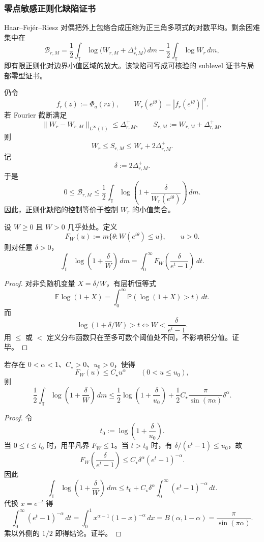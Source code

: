 \subsubsection{零点敏感正则化缺陷证书}\label{subsubsec:typed-address-biaxial-completion-zero-aware-regularization-gap-certificate}
Haar--Fej\'er--Riesz 对偶把外上包络合成压缩为正三角多项式的对数平均。剩余困难集中在
\[
\mathcal B_{r,M}
=
\frac12\int_{\mathbb T}\log\bigl(W_{r,M}+\Delta_{r,M}^+\bigr)\,dm
-
\frac12\int_{\mathbb T}\log W_r\,dm,
\]
即有限正则化对边界小值区域的放大。该缺陷可写成可核验的 sublevel 证书与局部零型证书。

仍令
\[
f_r(z):=\Phi_a(rz),
\qquad
W_r(e^{i\theta})=|f_r(e^{i\theta})|^2.
\]
若 Fourier 截断满足
\[
\|W_r-W_{r,M}\|_{L^\infty(\mathbb T)}\le\Delta_{r,M}^+,
\qquad
S_{r,M}:=W_{r,M}+\Delta_{r,M}^+,
\]
则
\[
W_r\le S_{r,M}\le W_r+2\Delta_{r,M}^+.
\]
记
\[
\delta:=2\Delta_{r,M}^+.
\]
于是
\[
0\le
\mathcal B_{r,M}
\le
\frac12\int_{\mathbb T}
\log\left(1+\frac{\delta}{W_r(e^{i\theta})}\right)\,dm.
\]
因此，正则化缺陷的控制等价于控制 \(W_r\) 的小值集合。

\begin{lemma}[小值分布恒等式]\label{lem:typed-address-biaxial-completion-sublevel-distribution-identity}
设 \(W\ge0\) 且 \(W>0\) 几乎处处。定义
\[
F_W(u):=m\{\theta:W(e^{i\theta})\le u\},
\qquad u>0.
\]
则对任意 \(\delta>0\)，
\[
\int_{\mathbb T}
\log\left(1+\frac{\delta}{W}\right)\,dm
=
\int_0^\infty
F_W\!\left(\frac{\delta}{e^t-1}\right)\,dt.
\]
\end{lemma}
\begin{proof}
对非负随机变量 \(X=\delta/W\)，有层析恒等式
\[
\mathbb E\log(1+X)
=
\int_0^\infty
\mathbb P(\log(1+X)>t)\,dt.
\]
而
\[
\log(1+\delta/W)>t
\iff
W<\frac{\delta}{e^t-1}.
\]
用 \(\le\) 或 \(<\) 定义分布函数只在至多可数个阈值处不同，不影响积分值。证毕。
\end{proof}

\begin{proposition}\label{prop:typed-address-biaxial-completion-sublevel-regularization-gap-bound}
若存在 \(0<\alpha<1\)、\(C_\star>0\)、\(u_0>0\)，使得
\[
F_W(u)\le C_\star u^\alpha
\qquad(0<u\le u_0),
\]
则
\[
\frac12\int_{\mathbb T}
\log\left(1+\frac{\delta}{W}\right)\,dm
\le
\frac12\log\left(1+\frac{\delta}{u_0}\right)
+
\frac12 C_\star
\frac{\pi}{\sin(\pi\alpha)}
\delta^\alpha.
\]
\end{proposition}
\begin{proof}
令
\[
t_0:=\log\left(1+\frac{\delta}{u_0}\right).
\]
当 \(0\le t\le t_0\) 时，用平凡界 \(F_W\le1\)。当 \(t>t_0\) 时，有 \(\delta/(e^t-1)\le u_0\)，故
\[
F_W\!\left(\frac{\delta}{e^t-1}\right)
\le
C_\star\delta^\alpha(e^t-1)^{-\alpha}.
\]
因此
\[
\int_{\mathbb T}
\log\left(1+\frac{\delta}{W}\right)\,dm
\le
t_0+C_\star\delta^\alpha
\int_0^\infty(e^t-1)^{-\alpha}\,dt.
\]
代换 \(x=e^{-t}\) 得
\[
\int_0^\infty(e^t-1)^{-\alpha}\,dt
=
\int_0^1 x^{\alpha-1}(1-x)^{-\alpha}\,dx
=
B(\alpha,1-\alpha)
=
\frac{\pi}{\sin(\pi\alpha)}.
\]
乘以外侧的 \(1/2\) 即得结论。证毕。
\end{proof}

